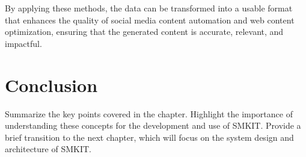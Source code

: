 By applying these methods, the data can be transformed into a usable format that enhances the quality of social media content automation and web content optimization, ensuring that the generated content is accurate, relevant, and impactful.


\section{Conclusion}
\label{sec:preliminaries_conclusion}
Summarize the key points covered in the chapter.
Highlight the importance of understanding these concepts for the development and use of SMKIT. Provide a brief transition to the next chapter, which will focus on the system design and architecture of SMKIT.
